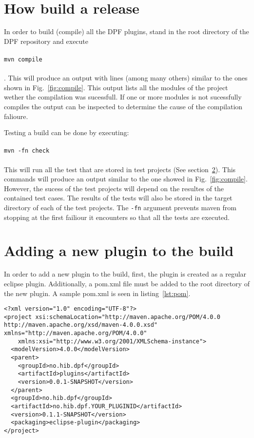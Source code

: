 \documentclass[a4paper]{article}
\newcommand{\code}[1]{\\ \\ \texttt{#1} \\ \\ }
\begin{document}
\section{How build a release}

In order to build (compile) all the DPF plugins, stand in the root directory of the DPF repository and execute \code{mvn compile}. This will produce an
output with lines (among many others) similar to the ones shown in Fig.~\ref{fig:compile}. This output lists all the modules of the project wether the compilation was 
sucessfull. If one or more modules is not sucessfully compiles the output can be inspected to determine the cause of the compilation falioure. 

Testing a build can be done by executing: \code{mvn -fn check}
This will run all the test that are stored in test projects (See section~\ref{sec:plugins}).
This commands will produce an output similar to the one showed in Fig.~\ref{fig:compile}. However, the sucess of the test projects will depend on the resultes of the 
contained test cases. The results of the tests will also be stored in the target directory of each of the test projects. The \texttt{-fn} argument prevents maven from stopping at the first failiour it encounters so that all the tests are executed.


\section{Adding a new plugin to the build}
\label{sec:plugins}

In order to add a new plugin to the build, first, the plugin is created as a regular eclipse plugin. Additionally, a pom.xml file must be added to the root directory
of the new plugin. A sample pom.xml is seen in listing~\ref{lst:pom}.

\begin{lstlisting}[caption={Sample pom.xml}]
<?xml version="1.0" encoding="UTF-8"?>
<project xsi:schemaLocation="http://maven.apache.org/POM/4.0.0 http://maven.apache.org/xsd/maven-4.0.0.xsd" xmlns="http://maven.apache.org/POM/4.0.0"
    xmlns:xsi="http://www.w3.org/2001/XMLSchema-instance">
  <modelVersion>4.0.0</modelVersion>
  <parent>
    <groupId>no.hib.dpf</groupId>
    <artifactId>plugins</artifactId>
    <version>0.0.1-SNAPSHOT</version>
  </parent>
  <groupId>no.hib.dpf</groupId>
  <artifactId>no.hib.dpf.YOUR_PLUGINID</artifactId>
  <version>0.1.1-SNAPSHOT</version>
  <packaging>eclipse-plugin</packaging>
</project>
\end{lstlisting}
\end{document}
